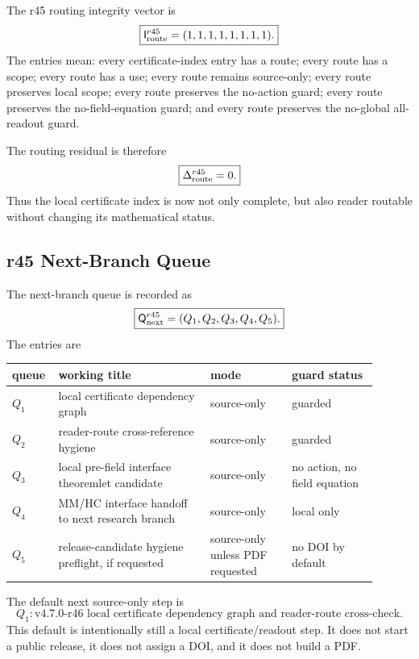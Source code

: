The r45 routing integrity vector is
\[
\boxed{
\mathsf I_{\rm route}^{r45}
=(1,1,1,1,1,1,1,1).
}
\]
The entries mean: every certificate-index entry has a route; every route has a
scope; every route has a use; every route remains source-only; every route
preserves local scope; every route preserves the no-action guard; every route
preserves the no-field-equation guard; and every route preserves the no-global
all-readout guard.

The routing residual is therefore
\[
\boxed{
\Delta_{\rm route}^{r45}=0.
}
\]
Thus the local certificate index is now not only complete, but also reader
routable without changing its mathematical status.

\subsection{r45 Next-Branch Queue}
\label{subsec:r45-next-branch-queue}

The next-branch queue is recorded as
\[
\boxed{
\mathsf Q_{\rm next}^{r45}
=
(Q_1,Q_2,Q_3,Q_4,Q_5).
}
\]
The entries are
\begin{center}
\begin{tabular}{@{}>{\raggedright\arraybackslash}p{0.08\linewidth}>{\raggedright\arraybackslash}p{0.39\linewidth}>{\raggedright\arraybackslash}p{0.21\linewidth}>{\raggedright\arraybackslash}p{0.22\linewidth}@{}}
queue & working title & mode & guard status\\
\hline
\(Q_1\) & local certificate dependency graph & source-only & guarded\\
\(Q_2\) & reader-route cross-reference hygiene & source-only & guarded\\
\(Q_3\) & local pre-field interface theoremlet candidate & source-only & no action, no field equation\\
\(Q_4\) & MM/HC interface handoff to next research branch & source-only & local only\\
\(Q_5\) & release-candidate hygiene preflight, if requested & source-only unless PDF requested & no DOI by default\\
\end{tabular}
\end{center}
The default next source-only step is
\[
\boxed{
Q_1:
\text{v4.7.0-r46 local certificate dependency graph and reader-route cross-check.}
}
\]
This default is intentionally still a local certificate/readout step.  It does
not start a public release, it does not assign a DOI, and it does not build a
PDF.

